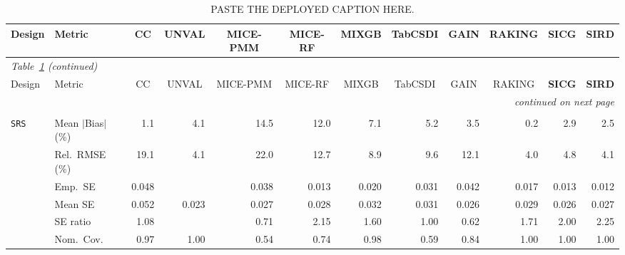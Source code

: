 \begin{landscape}
\footnotesize\setlength{\tabcolsep}{3.5pt}
\begin{longtable}{llrrrrrrrrrr}
\caption{PASTE THE DEPLOYED CAPTION HERE.}
\label{tab:appc_vccc_LM} \\
\toprule
Design & Metric & \multicolumn{1}{c}{CC} & \multicolumn{1}{c}{UNVAL} & \multicolumn{1}{c}{MICE-PMM} & \multicolumn{1}{c}{MICE-RF} & \multicolumn{1}{c}{MIXGB} & \multicolumn{1}{c}{TabCSDI} & \multicolumn{1}{c}{GAIN} & \multicolumn{1}{c}{RAKING} & \multicolumn{1}{c}{\textbf{SICG}} & \multicolumn{1}{c}{\textbf{SIRD}} \\
\midrule \endfirsthead
\multicolumn{12}{l}{\footnotesize\itshape Table~\ref{tab:appc_vccc_LM} (continued)} \\
\toprule
Design & Metric & \multicolumn{1}{c}{CC} & \multicolumn{1}{c}{UNVAL} & \multicolumn{1}{c}{MICE-PMM} & \multicolumn{1}{c}{MICE-RF} & \multicolumn{1}{c}{MIXGB} & \multicolumn{1}{c}{TabCSDI} & \multicolumn{1}{c}{GAIN} & \multicolumn{1}{c}{RAKING} & \multicolumn{1}{c}{\textbf{SICG}} & \multicolumn{1}{c}{\textbf{SIRD}} \\
\midrule \endhead
\midrule \multicolumn{12}{r}{\footnotesize\itshape continued on next page} \\
\endfoot
\bottomrule \endlastfoot
\multicolumn{12}{l}{\textbf{Continuous Phase-Two Covariates}} \\
\addlinespace[2pt]
\quad \texttt{SRS} & Mean $|$Bias$|$ (\%) & \cellcolor{ranktwo}1.1 & 4.1 & 14.5 & 12.0 & 7.1 & 5.2 & 3.5 & \cellcolor{rankone}0.2 & 2.9 & \cellcolor{rankthree}2.5 \\
 & Rel.\ RMSE (\%) & 19.1 & \cellcolor{rankthree}4.1 & 22.0 & 12.7 & 8.9 & 9.6 & 12.1 & \cellcolor{rankone}4.0 & 4.8 & \cellcolor{ranktwo}4.1 \\
 & Emp.\ SE & 0.048 &  & 0.038 & 0.013 & 0.020 & 0.031 & 0.042 & 0.017 & 0.013 & 0.012 \\
 & Mean SE & 0.052 & 0.023 & 0.027 & 0.028 & 0.032 & 0.031 & 0.026 & 0.029 & 0.026 & 0.027 \\
 & SE ratio & \cellcolor{ranktwo}1.08 &  & \cellcolor{rankthree}0.71 & 2.15 & 1.60 & \cellcolor{rankone}1.00 & 0.62 & 1.71 & 2.00 & 2.25 \\
 & Nom.\ Cov. & \cellcolor{rankone}0.97 & 1.00 & 0.54 & 0.74 & \cellcolor{ranktwo}0.98 & 0.59 & 0.84 & \cellcolor{rankthree}1.00 & 1.00 & 1.00 \\

\end{longtable}
\end{landscape}
